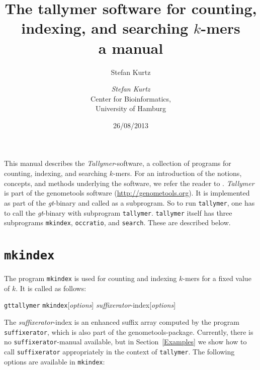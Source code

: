 \documentclass[12pt]{article}
\title{The tallymer software for counting, indexing, and searching $k$-mers\\
a manual}
\author{Stefan Kurtz}
\author{\begin{tabular}{c}
         \textit{Stefan Kurtz}\\
         Center for Bioinformatics,\\
         University of Hamburg
        \end{tabular}}
\date{26/08/2013}
\newcommand{\Programname}[1]{\texttt{\small #1}}
\newcommand{\Tallymer}[0]{\Programname{tallymer}\xspace}
\newcommand{\TYmkindex}[0]{\Programname{mkindex}\xspace}
\newcommand{\TYsearch}[0]{\Programname{search}\xspace}
\newcommand{\TYoccratio}[0]{\Programname{occratio}\xspace}
\newcommand{\SFX}[0]{\Programname{suffixerator}\xspace}
\newcommand{\SFXidx}[0]{\textit{suffixerator}-index\xspace}
\newcommand{\GT}[0]{\Programname{gt}\xspace}
\newcommand{\Typrogintro}[1]{
\par
\noindent\GT \Programname{tallymer} #1\xspace [\textit{options}] \Showoption{esa}
\SFXidx [\textit{options}]
\par
The \SFXidx is an enhanced suffix array computed by the
program \SFX, which is also part of the genometools-package. Currently,
there is no \SFX-manual available, but in Section~\ref{Examples} we show how
to call \SFX appropriately in  the context of
\Tallymer. The following options are available in #1:}
\begin{document}
\maketitle
This manual describes the \textit{Tallymer}-software, a collection of programs
for counting, indexing, and searching $k$-mers. For an introduction of
the notions, concepts, and methods underlying the software, we refer
the reader to \cite{KUR:NER:STE:WAR:2008}. \textit{Tallymer} is part of
the genometools software (\url{http://genometools.org}). It is implemented
as part of the \textit{gt}-binary and called as a subprogram. So to
run \Tallymer, one has to call the \textit{gt}-binary with subprogram
\texttt{tallymer}. \Tallymer itself has three subprograms
\TYmkindex, \TYoccratio, and \TYsearch. These are described below.

\section{\TYmkindex}
The program \TYmkindex is used for counting and indexing \(k\)-mers for
a fixed value of \(k\). It is called as follows:
\par
\Typrogintro{\TYmkindex}
\end{document}
